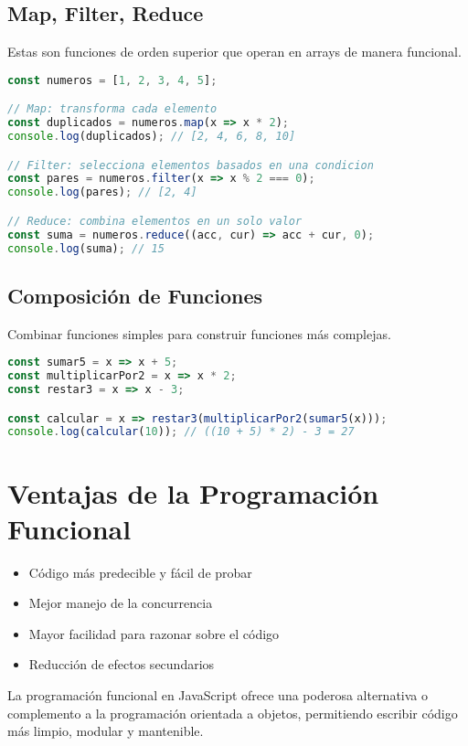 \documentclass{book}
\begin{document}
\subsection{Map, Filter, Reduce}

Estas son funciones de orden superior que operan en arrays de manera funcional.

\begin{lstlisting}[language=JavaScript]
const numeros = [1, 2, 3, 4, 5];

// Map: transforma cada elemento
const duplicados = numeros.map(x => x * 2);
console.log(duplicados); // [2, 4, 6, 8, 10]

// Filter: selecciona elementos basados en una condicion
const pares = numeros.filter(x => x % 2 === 0);
console.log(pares); // [2, 4]

// Reduce: combina elementos en un solo valor
const suma = numeros.reduce((acc, cur) => acc + cur, 0);
console.log(suma); // 15
\end{lstlisting}

\subsection{Composición de Funciones}

Combinar funciones simples para construir funciones más complejas.

\begin{lstlisting}[language=JavaScript]
const sumar5 = x => x + 5;
const multiplicarPor2 = x => x * 2;
const restar3 = x => x - 3;

const calcular = x => restar3(multiplicarPor2(sumar5(x)));
console.log(calcular(10)); // ((10 + 5) * 2) - 3 = 27
\end{lstlisting}

\section{Ventajas de la Programación Funcional}

\begin{itemize}
    \item Código más predecible y fácil de probar
    \item Mejor manejo de la concurrencia
    \item Mayor facilidad para razonar sobre el código
    \item Reducción de efectos secundarios
\end{itemize}

La programación funcional en JavaScript ofrece una poderosa alternativa o complemento a la programación orientada a objetos, permitiendo escribir código más limpio, modular y mantenible.
\end{document}

